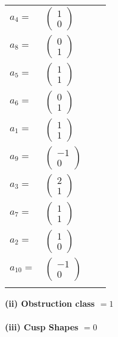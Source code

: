 \documentclass[1p]{elsarticle_modified}
\theoremstyle{definition}
\begin{document}
\begin{tabular}{m{7pt} m{180pt} m{7pt} m{180pt} }
\flushright $a_{4}=$&$\begin{pmatrix}1\\0\end{pmatrix}$ \\
\flushright $a_{8}=$&$\begin{pmatrix}0\\1\end{pmatrix}$ \\
\flushright $a_{5}=$&$\begin{pmatrix}1\\1\end{pmatrix}$ \\
\flushright $a_{6}=$&$\begin{pmatrix}0\\1\end{pmatrix}$ \\
\flushright $a_{1}=$&$\begin{pmatrix}1\\1\end{pmatrix}$ \\
\flushright $a_{9}=$&$\begin{pmatrix}-1\\0\end{pmatrix}$ \\
\flushright $a_{3}=$&$\begin{pmatrix}2\\1\end{pmatrix}$ \\
\flushright $a_{7}=$&$\begin{pmatrix}1\\1\end{pmatrix}$ \\
\flushright $a_{2}=$&$\begin{pmatrix}1\\0\end{pmatrix}$ \\
\flushright $a_{10}=$&$\begin{pmatrix}-1\\0\end{pmatrix}$\\&\end{tabular}
\flushleft \textbf{(ii) Obstruction class $= 1$}\\~\\
\flushleft \textbf{(iii) Cusp Shapes $= 0$}\\~\\
\newpage\renewcommand{\arraystretch}{1}
\end{document}
